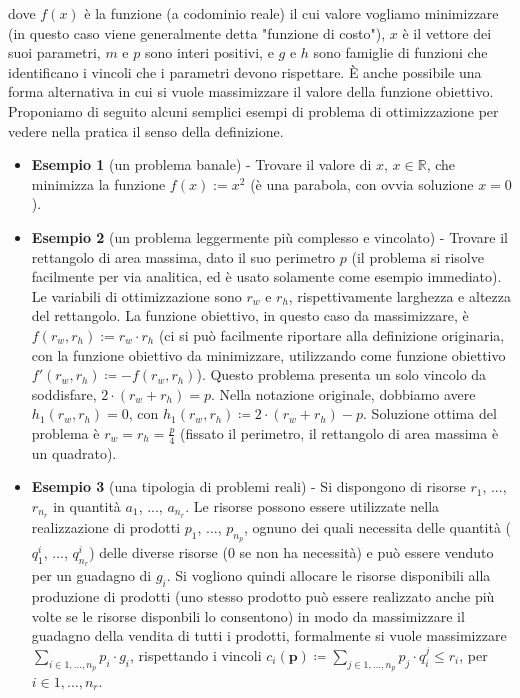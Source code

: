\documentclass[12pt]{article}
\begin{document}
dove $f(x)$ è la funzione (a codominio reale) il cui valore vogliamo minimizzare (in questo caso viene generalmente detta "funzione di costo"), $x$ è il vettore dei suoi parametri, $m$ e $p$ sono interi positivi, e $g$ e $h$ sono famiglie di funzioni che identificano i vincoli che i parametri devono rispettare.
È anche possibile una forma alternativa in cui si vuole massimizzare il valore della funzione obiettivo.\newline
\newline
Proponiamo di seguito alcuni semplici esempi di problema di ottimizzazione per vedere nella pratica il senso della definizione.
\begin{itemize}
\item \textbf{Esempio 1} (un problema banale) - Trovare il valore di $x$, $x\in \mathbb{R}$, che minimizza la funzione $f(x) := x^2$ (è una parabola, con ovvia soluzione $x = 0$).

\item \textbf{Esempio 2} (un problema leggermente più complesso e vincolato) - Trovare il rettangolo di area massima, dato il suo perimetro $p$ (il problema si risolve facilmente per via analitica, ed è usato solamente come esempio immediato). Le variabili di ottimizzazione sono $r_w$ e $r_h$, rispettivamente larghezza e altezza del rettangolo. La funzione obiettivo, in questo caso da massimizzare, è $f(r_w, r_h) := r_w \cdot r_h$ (ci si può facilmente riportare alla definizione originaria, con la funzione obiettivo da minimizzare, utilizzando come funzione obiettivo $f'(r_w, r_h) \coloneqq -f(r_w, r_h)$). Questo problema presenta un solo vincolo da soddisfare, $2 \cdot (r_w+r_h) = p$. Nella notazione originale, dobbiamo avere $h_1(r_w, r_h) = 0$, con $h_1(r_w, r_h) \coloneqq 2 \cdot (r_w+r_h)-p$. Soluzione ottima del problema è $r_w = r_h = \frac{p}{4}$ (fissato il perimetro, il rettangolo di area massima è un quadrato).

\item \textbf{Esempio 3} (una tipologia di problemi reali) - Si dispongono di risorse $r_1$, ..., $r_{n_r}$ in quantità $a_1$, ..., $a_{n_r}$. Le risorse possono essere utilizzate nella realizzazione di prodotti $p_1$, ..., $p_{n_p}$, ognuno dei quali necessita delle quantità ($q^i_{1}$, ..., $q^i_{n_r}$) delle diverse risorse (0 se non ha necessità) e può essere venduto per un guadagno di $g_i$. Si vogliono quindi allocare le risorse disponibili alla produzione di prodotti (uno stesso prodotto può essere realizzato anche più volte se le risorse disponbili lo consentono) in modo da massimizzare il guadagno della vendita di tutti i prodotti, formalmente si vuole massimizzare $\underset{\displaystyle i \in 1,...,n_p}{\sum} p_i \cdot g_i$, rispettando i vincoli $c_i(\textbf{p}) \coloneqq \underset{\displaystyle j \in 1,...,n_p}{\sum} p_j \cdot q^j_{i} \leq r_i$, per $i \in 1,...,n_r$.

\end{itemize}
\end{document}
